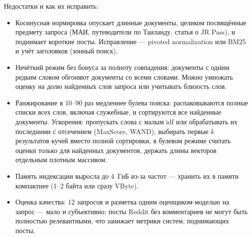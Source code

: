 Недостатки и как их исправить:
\begin{itemize}
    \item Косинусная нормировка опускает длинные документы, целиком посвящённые предмету запроса (МАИ, путеводители по Таиланду, статья о JR Pass), и поднимает короткие посты. Исправление --- pivoted normalization или BM25 и учёт заголовков (зонный поиск).
    \item Нечёткий режим без бонуса за полноту совпадения: документы с одним редким словом обгоняют документы со всеми словами. Можно умножать оценку на долю найденных слов запроса или учитывать близость слов.
    \item Ранжирование в 10--90 раз медленнее булева поиска: распаковываются полные списки всех слов, включая служебные, и сортируются все найденные документы. Ускорения: пропускать слова с малым idf или обрабатывать их последними с отсечением (MaxScore, WAND), выбирать первые $k$ результатов кучей вместо полной сортировки, в булевом режиме считать оценки только для найденных документов, держать длины векторов отдельным плотным массивом.
    \item Память индексации выросла до 4~ГиБ из-за частот --- хранить их в памяти компактнее (1--2 байта или сразу VByte).
    \item Оценка качества: 12 запросов и разметка одним оценщиком-моделью на запрос --- мало и субъективно; посты Reddit без комментариев не могут быть полностью релевантными, что занижает метрики систем, поднимающих посты.
\end{itemize}
